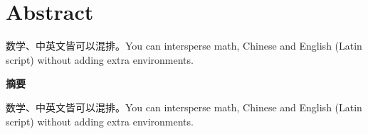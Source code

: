 \chapter*{Abstract}
\label{C:Abstract}



数学、中英文皆可以混排。You can intersperse math, Chinese and English (Latin script) without adding extra environments.

\newpage



\Huge \textbf{摘要}

\vspace{1.5cm}

\normalsize
数学、中英文皆可以混排。You can intersperse math, Chinese and English (Latin script) without adding extra environments.

